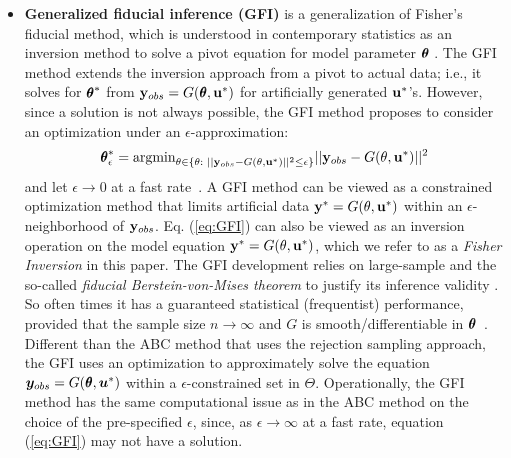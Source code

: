 \documentclass[12pt]{article}
\theoremstyle{shortspace}
\def\*#1{\bm{#1}}
\def\btheta{\mathop{\theta\kern-.45em\hbox{$\theta$}}\nolimits}
\begin{document}
\begin{itemize}
There are two remaining issues unsolved in the ABC method~\citep[cf.,][]{Li2016,Thornton2018}. First, when $S(\cdot)$
is not sufficient, $p_{\epsilon}(\btheta | \*y_{obs}) \not\to p(\btheta | \*y_{obs})$.  
In this case,
there is no guarantee that an ABC posterior is a Bayesian posterior, thus 
the interpretation of the inferential result by the ABC posterior is unclear.  
However, it is not possible to
derive a sufficient statistic when the likelihood is intractable. Thus, the requirement that $S(\cdot)$ is sufficient places a limitation on the practical use of the ABC method (as a likelihood-free inference approach). 
Second, the ABC method requires the preset threshold value $\epsilon \to 0$ at a fast rate, leading to a degeneracy of computing efficiency. This is because the acceptance probability in Step [b] goes to $0$ for a very small $\epsilon \to 0$. 
In practice, there is no clear-cut choice for an appropriate $\epsilon$ to balance the procedure' computational efficiency and inference validity. It 
remains to be an unsolved question in the literature \cite[e.g.,][]{Li2016}. 


\item {\bf  Generalized fiducial inference (GFI)} is a generalization of Fisher's fiducial method, which is understood in contemporary statistics as {an inversion method} to solve a pivot equation for model parameter $\btheta$ \citep{Zabell1992, Hannig2016, Thornton2022}. 
The GFI method extends the inversion approach from a pivot to actual data; i.e., it solves for $\btheta^*$ from
${\bf y}_{obs} = G(\btheta, {\bf u}^*)$ for artificially generated ${\bf u}^*$'s. However, since a solution is not always possible, the GFI method proposes to 
consider an optimization under an $\epsilon$-approximation: 
\begin{equation}
 \btheta_\epsilon^* =  {\rm argmin}_{\theta \in \{\theta: \,\, || {\bf y}_{obs} - G(\theta, {\bf u}^*)||^2 \leq \epsilon \}}  || {\bf y}_{obs} - G({\theta}, {\bf u}^*)||^2
\label{eq:GFI}
\end{equation}
and let $\epsilon \to 0$ at a fast rate~\citep{Hannig2016}.
A GFI method can be
viewed as a constrained optimization method that limits artificial data ${\bf y}^* = G({\theta}, {\bf u}^*)$ within an $\epsilon$-neighborhood of ${\bf y}_{obs}$. 
Eq. (\ref{eq:GFI}) can also be viewed as an inversion operation on the model equation ${\bf y}^* = G({\theta}, {\bf u}^*)$, which we refer to as a {\it Fisher Inversion} in this paper. 
The GFI development  relies on large-sample and the so-called {\it fiducial Berstein-von-Mises theorem} to justify its inference validity \citep{Hannig2016}. So often times it has a guaranteed statistical (frequentist) performance, provided that the sample size $n \to \infty$ and $G$ is smooth/differentiable in $\btheta$~\citep{Hannig2009, Hannig2016}. Different than the ABC method that uses the rejection sampling approach, the GFI uses an optimization to approximately solve the equation $\*y_{obs} = G(\btheta, \*u^*)$ within a $\epsilon$-constrained set in $\Theta$.
Operationally, the 
GFI method has the same computational issue as in the ABC method on the choice of the pre-specified $\epsilon$, since, 
as $\epsilon \to \infty$ at a fast rate, equation (\ref{eq:GFI}) may not have a solution. 


\end{itemize}
\end{document}
